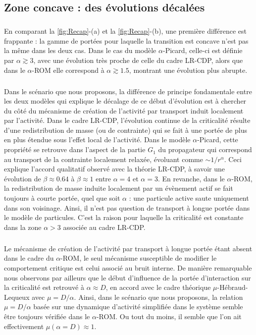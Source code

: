 \subsection{Zone concave : des évolutions décalées}

\subparagraph{}En comparant la \autoref{fig:Recap}-(a) et la \autoref{fig:Recap}-(b), une première différence est frappante : la gamme de portées pour laquelle la transition est concave n'est pas la même dans les deux cas. Dans le cas du modèle $\alpha$-Picard, celle-ci est définie par $\alpha \gtrsim 3$, avec une évolution très proche de celle du cadre LR-CDP, alors que dans le $\alpha$-ROM elle correspond à $\alpha \gtrsim 1.5$, montrant une évolution plus abrupte.

\subparagraph{}Dans le scénario que nous proposons, la différence de principe fondamentale entre les deux modèles qui explique le décalage de ce début d'évolution est à chercher du côté du mécanisme de création de l'activité par transport induit localement par l'activité. Dans le cadre LR-CDP, l'évolution continue de la criticalité résulte d'une redistribution de masse (ou de contrainte) qui se fait à une portée de plus en plus étendue sous l'effet local de l'activité. Dans le modèle $\alpha$-Picard, cette propriété se retrouve dans l'aspect de la partie $G_1$ du propagateur qui correspond au transport de la contrainte localement relaxée, évoluant comme $\sim 1/r^\alpha$. Ceci explique l'accord qualitatif observé avec la théorie LR-CDP, à savoir une évolution de $\beta \approx 0.64$ à $\beta \approx 1$ entre $\alpha = 4$ et $\alpha = 3$. En revanche, dans le $\alpha$-ROM, la redistribution de masse induite localement par un évènement actif se fait toujours à courte portée, quel que soit $\alpha$ : une particule active saute uniquement dans son voisinage. Ainsi, il n'est pas question de transport à longue portée dans le modèle de particules. C'est la raison pour laquelle la criticalité est constante dans la zone $\alpha > 3$ associée au cadre LR-CDP.

\subparagraph{}Le mécanisme de création de l'activité par transport à longue portée étant absent dans le cadre du $\alpha$-ROM, le seul mécanisme susceptible de modifier le comportement critique est celui associé au bruit interne. De manière remarquable nous observons par ailleurs que le début d'influence de la portée d'interaction sur la criticalité est retrouvé à $\alpha \approx D$, en accord avec le cadre théorique $\mu$-Hébraud-Lequeux avec $\mu = D/\alpha$. Ainsi, dans le scénario que nous proposons, la relation $\mu = D/\alpha$ basée sur une dynamique d'activité simplifiée dans le système semble être toujours vérifiée dans le $\alpha$-ROM. Ou tout du moins, il semble que l'on ait effectivement $\mu(\alpha = D) \approx 1$.

